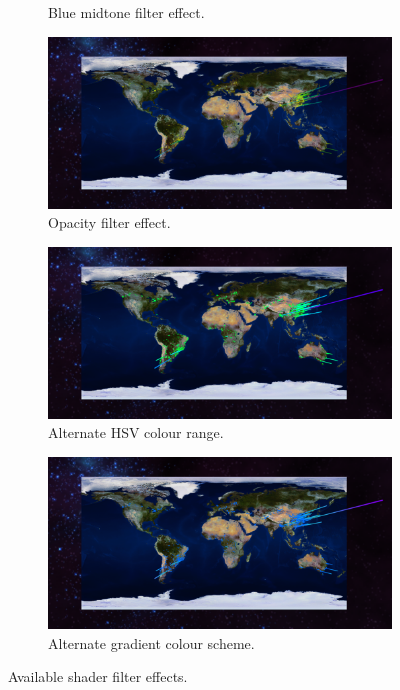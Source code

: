 \begin{figure}[H]
\begin{subfigure}[b]{\figurewidth}
		\caption{Blue midtone filter effect.}
		\label{fig:blue_midtone}
	\end{subfigure}
	\begin{subfigure}[b]{\figurewidth}
		\includegraphics[width=\textwidth]{images/implementation/shaders/opacity}
		\caption{Opacity filter effect.}
		\label{fig:opacity_filter}
	\end{subfigure}
	\begin{subfigure}[b]{\figurewidth}
		\includegraphics[width=\textwidth]{images/implementation/shaders/basic}
		\caption{Alternate HSV colour range.}
		\label{fig:hsv_colour}
	\end{subfigure}
	\begin{subfigure}[b]{\figurewidth}
		\includegraphics[width=\textwidth]{images/implementation/shaders/gradient}
		\caption{Alternate gradient colour scheme.}
		\label{fig:gradient_colour}
	\end{subfigure}
	\caption[Shaders]{Available shader filter effects.}
	\label{fig:shaders}
\end{figure}
